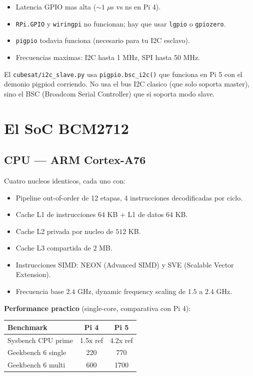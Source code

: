 \documentclass[11pt,a4paper,oneside]{report}
\begin{document}
\begin{itemize}[leftmargin=2em]
  \item Latencia GPIO mas alta ($\sim 1\;\mu$s vs ns en Pi 4).
  \item \texttt{RPi.GPIO} y \texttt{wiringpi} no funcionan; hay que usar \texttt{lgpio} o \texttt{gpiozero}.
  \item \texttt{pigpio} todavia funciona (necesario para tu I2C esclavo).
  \item Frecuencias maximas: I2C hasta 1 MHz, SPI hasta 50 MHz.
\end{itemize}

\begin{nota}
El \texttt{cubesat/i2c\_slave.py} usa \texttt{pigpio.bsc\_i2c()} que funciona
en Pi 5 con el demonio pigpiod corriendo. No usa el bus I2C clasico (que
solo soporta master), sino el BSC (Broadcom Serial Controller) que si
soporta modo slave.
\end{nota}

\chapter{El SoC BCM2712}

\section{CPU --- ARM Cortex-A76}

Cuatro nucleos identicos, cada uno con:

\begin{itemize}[leftmargin=2em]
  \item Pipeline out-of-order de 12 etapas, 4 instrucciones decodificadas por ciclo.
  \item Cache L1 de instrucciones $64$ KB + L1 de datos $64$ KB.
  \item Cache L2 privada por nucleo de $512$ KB.
  \item Cache L3 compartida de $2$ MB.
  \item Instrucciones SIMD: NEON (Advanced SIMD) y SVE (Scalable Vector Extension).
  \item Frecuencia base $2.4$ GHz, dynamic frequency scaling de $1.5$ a $2.4$ GHz.
\end{itemize}

\textbf{Performance practico} (single-core, comparativa con Pi 4):

\begin{center}
\begin{tabular}{lcc}
\toprule
\textbf{Benchmark} & \textbf{Pi 4} & \textbf{Pi 5} \\
\midrule
Sysbench CPU prime  & 1.5x ref  & 4.2x ref  \\
Geekbench 6 single  & 220       & 770       \\
Geekbench 6 multi   & 600       & 1700      \\
\bottomrule
\end{tabular}
\end{center}
\end{document}
